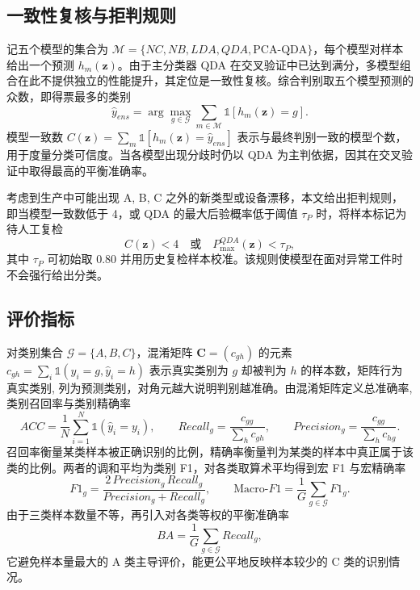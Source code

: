\documentclass[12pt,a4paper]{article}
\begin{document}
\subsection{一致性复核与拒判规则}

记五个模型的集合为 $\mathcal{M}=\{NC,NB,LDA,QDA,\text{PCA-QDA}\}$，每个模型对样本给出一个预测 $h_m(\mathbf{z})$。由于主分类器 QDA 在交叉验证中已达到满分，多模型组合在此不提供独立的性能提升，其定位是一致性复核。综合判别取五个模型预测的众数，即得票最多的类别
\begin{equation}
\hat{y}_{ens}=\arg\max_{g\in\mathcal{G}}\sum_{m\in\mathcal{M}}\mathbb{1}[h_m(\mathbf{z})=g].
\end{equation}
模型一致数 $C(\mathbf{z})=\sum_{m}\mathbb{1}[h_m(\mathbf{z})=\hat{y}_{ens}]$ 表示与最终判别一致的模型个数，用于度量分类可信度。当各模型出现分歧时仍以 QDA 为主判依据，因其在交叉验证中取得最高的平衡准确率。

考虑到生产中可能出现 A, B, C 之外的新类型或设备漂移，本文给出拒判规则，即当模型一致数低于 4，或 QDA 的最大后验概率低于阈值 $\tau_P$ 时，将样本标记为待人工复检
\begin{equation}
C(\mathbf{z})<4\quad\text{或}\quad P_{\max}^{QDA}(\mathbf{z})<\tau_P,
\end{equation}
其中 $\tau_P$ 可初始取 0.80 并用历史复检样本校准。该规则使模型在面对异常工件时不会强行给出分类。

\subsection{评价指标}

对类别集合 $\mathcal{G}=\{A,B,C\}$，混淆矩阵 $\mathbf{C}=(c_{gh})$ 的元素 $c_{gh}=\sum_{i}\mathbb{1}(y_i=g,\hat{y}_i=h)$ 表示真实类别为 $g$ 却被判为 $h$ 的样本数，矩阵行为真实类别, 列为预测类别，对角元越大说明判别越准确。由混淆矩阵定义总准确率, 类别召回率与类别精确率
\begin{equation}
ACC=\frac{1}{N}\sum_{i=1}^{N}\mathbb{1}(\hat{y}_i=y_i),\qquad
Recall_g=\frac{c_{gg}}{\sum_{h}c_{gh}},\qquad
Precision_g=\frac{c_{gg}}{\sum_{h}c_{hg}}.
\end{equation}
召回率衡量某类样本被正确识别的比例，精确率衡量判为某类的样本中真正属于该类的比例。两者的调和平均为类别 F1，对各类取算术平均得到宏 F1 与宏精确率
\begin{equation}
F1_g=\frac{2\,Precision_g\,Recall_g}{Precision_g+Recall_g},\qquad
\text{Macro-}F1=\frac{1}{G}\sum_{g\in\mathcal{G}}F1_g.
\end{equation}
由于三类样本数量不等，再引入对各类等权的平衡准确率
\begin{equation}
BA=\frac{1}{G}\sum_{g\in\mathcal{G}}Recall_g,
\end{equation}
它避免样本量最大的 A 类主导评价，能更公平地反映样本较少的 C 类的识别情况。
\end{document}
